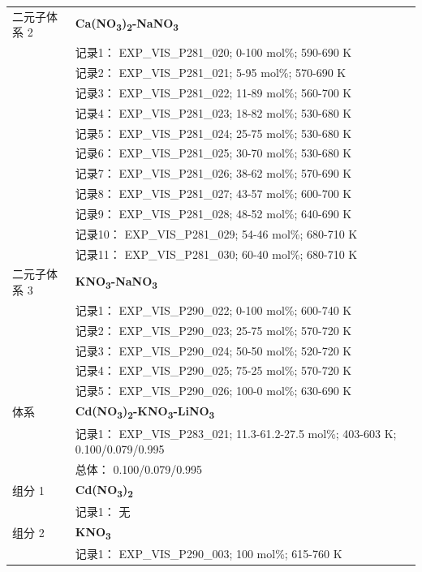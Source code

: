 \documentclass[12pt]{article}
\begin{document}
{\begin{longtable}[]{@{}
  >{\raggedright\arraybackslash}p{}
  >{\raggedright\arraybackslash}p{}@{}}
二元子体系 2  & \textbf{Ca(NO\textsubscript{3})\textsubscript{2}-NaNO\textsubscript{3}} \\
 & 记录1： EXP\_VIS\_P281\_020; 0-100 mol\%; 590-690 K \\
 & 记录2： EXP\_VIS\_P281\_021; 5-95 mol\%; 570-690 K \\
 & 记录3： EXP\_VIS\_P281\_022; 11-89 mol\%; 560-700 K \\
 & 记录4： EXP\_VIS\_P281\_023; 18-82 mol\%; 530-680 K \\
 & 记录5： EXP\_VIS\_P281\_024; 25-75 mol\%; 530-680 K \\
 & 记录6： EXP\_VIS\_P281\_025; 30-70 mol\%; 530-680 K \\
 & 记录7： EXP\_VIS\_P281\_026; 38-62 mol\%; 570-690 K \\
 & 记录8： EXP\_VIS\_P281\_027; 43-57 mol\%; 600-700 K \\
 & 记录9： EXP\_VIS\_P281\_028; 48-52 mol\%; 640-690 K \\
 & 记录10： EXP\_VIS\_P281\_029; 54-46 mol\%; 680-710 K \\
 & 记录11： EXP\_VIS\_P281\_030; 60-40 mol\%; 680-710 K  \\

二元子体系 3  & \textbf{KNO\textsubscript{3}-NaNO\textsubscript{3}} \\
 & 记录1： EXP\_VIS\_P290\_022; 0-100 mol\%; 600-740 K \\
 & 记录2： EXP\_VIS\_P290\_023; 25-75 mol\%; 570-720 K \\
 & 记录3： EXP\_VIS\_P290\_024; 50-50 mol\%; 520-720 K \\
 & 记录4： EXP\_VIS\_P290\_025; 75-25 mol\%; 570-720 K \\
 & 记录5： EXP\_VIS\_P290\_026; 100-0 mol\%; 630-690 K  \\

\midrule
体系 & \textbf{Cd(NO\textsubscript{3})\textsubscript{2}-KNO\textsubscript{3}-LiNO\textsubscript{3}} \\
 & 记录1： EXP\_VIS\_P283\_021; 11.3-61.2-27.5 mol\%; 403-603 K; 0.100/0.079/0.995 \\
 & 总体： 0.100/0.079/0.995  \\

组分 1 & \textbf{Cd(NO\textsubscript{3})\textsubscript{2}} \\
 & 记录1： 无 \\
组分 2  & \textbf{KNO\textsubscript{3}} \\
 & 记录1： EXP\_VIS\_P290\_003; 100 mol\%; 615-760 K  \\


\end{longtable}}
\end{document}
